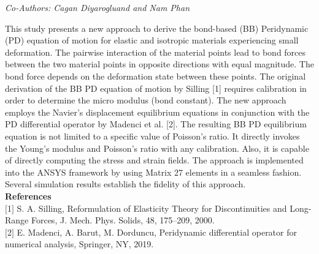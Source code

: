 \begin{center}
\textit{Co-Authors: Cagan Diyarogluand and Nam Phan}
\end{center} 
This study presents a new approach to derive the bond-based (BB) Peridynamic (PD) equation of motion for elastic and isotropic materials experiencing small deformation. The pairwise interaction of the material points lead to bond forces between the two material points in opposite directions with equal magnitude. The bond force depends on the deformation state between these points. The original derivation of the BB PD equation of motion by Silling [1] requires calibration in order to determine the micro modulus (bond constant). The new approach employs the Navier’s displacement equilibrium equations in conjunction with the PD differential operator by Madenci et al. [2]. The resulting BB PD equilibrium equation is not limited to a specific value of Poisson’s ratio. It directly invokes the Young’s modulus and Poisson’s ratio with any calibration. Also, it is capable of directly computing the stress and strain fields. The approach is implemented into the ANSYS framework by using Matrix 27 elements in a seamless fashion. Several simulation results establish the fidelity of this approach. \\

\noindent\textbf{References}\\
$[$1$]$ S. A. Silling, Reformulation of Elasticity Theory for Discontinuities and Long-Range Forces, J. Mech. Phys. Solids, 48, 175–209, 2000.\\\newline
$[$2$]$ E. Madenci, A. Barut, M. Dorduncu, Peridynamic differential operator for numerical analysis, Springer, NY, 2019.
